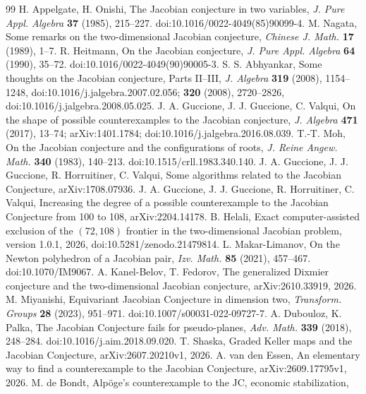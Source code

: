 \documentclass[11pt]{article}
\theoremstyle{definition}
\theoremstyle{remark}
\begin{document}
\begin{thebibliography}{99}
 H. Appelgate, H. Onishi, The Jacobian conjecture in two
variables, \emph{J. Pure Appl. Algebra} \textbf{37} (1985), 215--227. doi:10.1016/0022-4049(85)90099-4.
 M. Nagata, Some remarks on the two-dimensional Jacobian conjecture,
\emph{Chinese J. Math.} \textbf{17} (1989), 1--7.
 R. Heitmann, On the Jacobian conjecture, \emph{J. Pure Appl.
Algebra} \textbf{64} (1990), 35--72. doi:10.1016/0022-4049(90)90005-3.
 S. S. Abhyankar, Some thoughts on the Jacobian conjecture, Parts
II--III, \emph{J. Algebra} \textbf{319} (2008), 1154--1248, doi:10.1016/j.jalgebra.2007.02.056; \textbf{320} (2008),
2720--2826, doi:10.1016/j.jalgebra.2008.05.025.
 J. A. Guccione, J. J. Guccione, C. Valqui, On the shape of possible
counterexamples to the Jacobian conjecture, \emph{J. Algebra} \textbf{471} (2017), 13--74;
arXiv:1401.1784; doi:10.1016/j.jalgebra.2016.08.039.
 T.-T. Moh, On the Jacobian conjecture and the configurations of roots,
\emph{J. Reine Angew. Math.} \textbf{340} (1983), 140--213. doi:10.1515/crll.1983.340.140.
 J. A. Guccione, J. J. Guccione, R. Horruitiner, C. Valqui, Some
algorithms related to the Jacobian Conjecture, arXiv:1708.07936.
 J. A. Guccione, J. J. Guccione, R. Horruitiner, C. Valqui, Increasing
the degree of a possible counterexample to the Jacobian Conjecture from 100 to 108,
arXiv:2204.14178.
 B. Helali, Exact computer-assisted exclusion of the $(72,108)$ frontier in the
two-dimensional Jacobian problem, version 1.0.1, 2026, doi:10.5281/zenodo.21479814.
 L. Makar-Limanov, On the Newton polyhedron of a Jacobian pair,
\emph{Izv. Math.} \textbf{85} (2021), 457--467. doi:10.1070/IM9067.
 A. Kanel-Belov, T. Fedorov, The generalized Dixmier conjecture
and the two-dimensional Jacobian conjecture, arXiv:2610.33919, 2026.
 M. Miyanishi, Equivariant Jacobian Conjecture in dimension two,
\emph{Transform. Groups} \textbf{28} (2023), 951--971. doi:10.1007/s00031-022-09727-7.
 A. Dubouloz, K. Palka, The Jacobian Conjecture fails for
pseudo-planes, \emph{Adv. Math.} \textbf{339} (2018), 248--284. doi:10.1016/j.aim.2018.09.020.
 T. Shaska, Graded Keller maps and the Jacobian Conjecture,
arXiv:2607.20210v1, 2026.
 A. van den Essen, An elementary way to find a counterexample to the
Jacobian Conjecture, arXiv:2609.17795v1, 2026.
 M. de Bondt, Alp\"oge's counterexample to the JC, economic stabilization,

\end{thebibliography}
\end{document}
